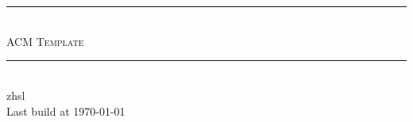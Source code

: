 \documentclass[12pt,oneside,a4paper]{article}
\begin{document}
\footnotesize
    \pagestyle{fancy}
    \lhead{}
    \chead{}
    \lfoot{} 
    \cfoot{}
    \rfoot{\bfseries\thepage} 
    \renewcommand{\headrulewidth}{0.4pt} 
    \renewcommand{\footrulewidth}{0.4pt}

    \begin{titlepage}
	~
	\pagestyle{empty}

        \begin{center}
        ~\\[160pt]
        
        \hrule\ \\[8pt]
        \fontsize{48pt}{\baselineskip}\selectfont  \textsc{ACM Template}\\[8pt]
        \hrule\ \\[340pt]

        \huge zhsl\\[8pt]
        \Large Last build at \today
        \end{center}
    \end{titlepage}


    \tableofcontents
    \clearpage

    
    \clearpage
    
    
    \clearpage
    
    
    \clearpage
    
    
    \clearpage
    
    
    \clearpage
    
    
    \clearpage
    
    
    \clearpage	
\end{document}
